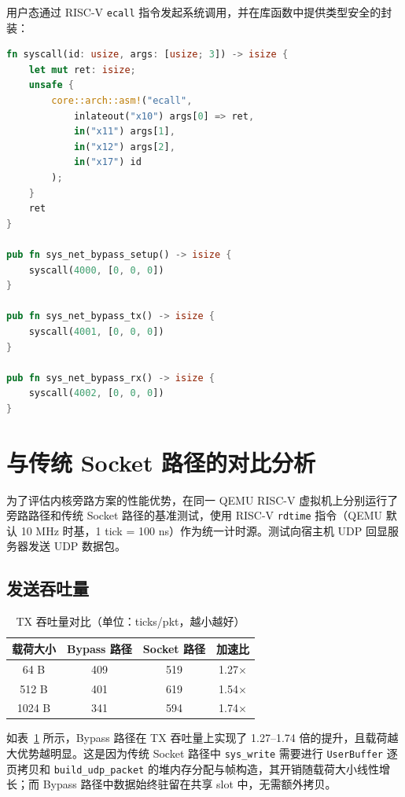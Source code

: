 用户态通过 RISC-V \texttt{ecall} 指令发起系统调用，并在库函数中提供类型安全的封装：

\begin{lstlisting}[language=Rust, caption={用户态系统调用封装}]
fn syscall(id: usize, args: [usize; 3]) -> isize {
    let mut ret: isize;
    unsafe {
        core::arch::asm!("ecall",
            inlateout("x10") args[0] => ret,
            in("x11") args[1],
            in("x12") args[2],
            in("x17") id
        );
    }
    ret
}

pub fn sys_net_bypass_setup() -> isize {
    syscall(4000, [0, 0, 0])
}

pub fn sys_net_bypass_tx() -> isize {
    syscall(4001, [0, 0, 0])
}

pub fn sys_net_bypass_rx() -> isize {
    syscall(4002, [0, 0, 0])
}
\end{lstlisting}

\section{与传统 Socket 路径的对比分析}

为了评估内核旁路方案的性能优势，在同一 QEMU RISC-V 虚拟机上分别运行了旁路路径和传统 Socket 路径的基准测试，使用 RISC-V \texttt{rdtime} 指令（QEMU 默认 10 MHz 时基，1 tick = 100 ns）作为统一计时源。测试向宿主机 UDP 回显服务器发送 UDP 数据包。

\subsection{发送吞吐量}

\begin{table}[htbp]
    \centering
    \caption{TX 吞吐量对比（单位：ticks/pkt，越小越好）}
    \label{tab:tx-throughput}
    \begin{tabular}{cccc}
        \toprule
        载荷大小 & Bypass 路径 & Socket 路径 & 加速比 \\
        \midrule
        64 B   & 409 & 519 & 1.27$\times$ \\
        512 B  & 401 & 619 & 1.54$\times$ \\
        1024 B & 341 & 594 & 1.74$\times$ \\
        \bottomrule
    \end{tabular}
\end{table}

如表~\ref{tab:tx-throughput} 所示，Bypass 路径在 TX 吞吐量上实现了 1.27--1.74 倍的提升，且载荷越大优势越明显。这是因为传统 Socket 路径中 \texttt{sys\_write} 需要进行 \texttt{UserBuffer} 逐页拷贝和 \texttt{build\_udp\_packet} 的堆内存分配与帧构造，其开销随载荷大小线性增长；而 Bypass 路径中数据始终驻留在共享 slot 中，无需额外拷贝。

